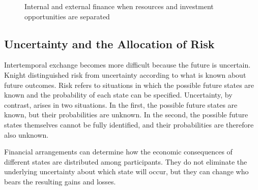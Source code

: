 \begin{figure}[H]

\caption{Internal and external finance when resources and investment opportunities are separated}
\label{fig:ch1-internal-external-finance}
\end{figure}


\subsection{Uncertainty and the Allocation of Risk}

Intertemporal exchange becomes more difficult because the future is uncertain. Knight distinguished risk from uncertainty according to what is known about future outcomes. Risk refers to situations in which the possible future states are known and the probability of each state can be specified. Uncertainty, by contrast, arises in two situations. In the first, the possible future states are known, but their probabilities are unknown. In the second, the possible future states themselves cannot be fully identified, and their probabilities are therefore also unknown.

Financial arrangements can determine how the economic consequences of different states are distributed among participants. They do not eliminate the underlying uncertainty about which state will occur, but they can change who bears the resulting gains and losses.

